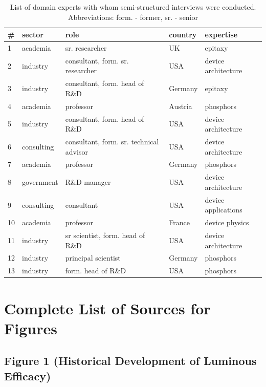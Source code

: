 \documentclass[10pt]{article}
\begin{document}
\begin{table}[h!]
\small
    \centering
    \begin{tabular}{|l|l|l|l|l|}
    \hline
        \textbf{\#} & \textbf{sector} & \textbf{role} & \textbf{country} & \textbf{expertise} \\ \hline
        1 & academia & sr. researcher & UK & epitaxy \\ \hline
        2 & industry & consultant, form. sr. researcher & USA & device architecture \\ \hline
        3 & industry & consultant, form. head of R\&D & Germany & epitaxy \\ \hline
        4 & academia & professor & Austria & phosphors \\ \hline
        5 & industry & consultant, form. head of R\&D & USA & device architecture \\ \hline
        6 & consulting & consultant, form. sr. technical advisor & USA & device architecture \\ \hline
        7 & academia & professor & Germany & phosphors \\ \hline
        8 & government & R\&D manager & USA & device architecture \\ \hline
        9 & consulting & consultant & USA & device applications \\ \hline
        10 & academia & professor & France & device physics \\ \hline
        11 & industry & sr scientist, form. head of R\&D & USA & device architecture \\ \hline
        12 & industry & principal scientist & Germany & phosphors \\ \hline
        13 & industry & form. head of R\&D & USA & phosphors \\ \hline
    \end{tabular}
    \label{tab:interviews}
    \caption{List of domain experts with whom semi-structured interviews were conducted. \\ Abbreviations: form. - former, sr. - senior}
\end{table}

\clearpage
\newpage
\section{Complete List of Sources for Figures}
\label{sec:sources}

\subsection{Figure 1 (Historical Development of Luminous Efficacy)}
\end{document}
